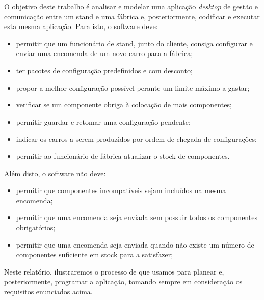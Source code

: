 O objetivo deste trabalho é analisar e modelar uma aplicação \textit{desktop} de gestão e comunicação entre um stand e uma fábrica e, posteriormente, codificar e executar esta mesma aplicação. Para isto, o software deve:
\begin{itemize}
    \item permitir que um funcionário de stand, junto do cliente, consiga configurar e enviar uma encomenda de um novo carro para a fábrica;
    \item ter pacotes de configuração predefinidos e com desconto;
    \item propor a melhor configuração possível perante um limite máximo a gastar;
    \item verificar se um componente obriga à colocação de mais componentes; 
    \item permitir guardar e retomar uma configuração pendente;
    \item indicar os carros a serem produzidos por ordem de chegada de configurações;
    \item permitir ao funcionário de fábrica atualizar o stock de componentes.
\end{itemize}

\noindent
Além disto, o software \underline{não} deve:

\begin{itemize}
    \item permitir que componentes incompatíveis sejam incluídos na mesma encomenda;
    \item permitir que uma encomenda seja enviada sem possuir todos os componentes obrigatórios;
    \item permitir que uma encomenda seja enviada quando não existe um número de componentes suficiente em stock para a satisfazer;
\end{itemize}

\noindent
Neste relatório, ilustraremos o processo de que usamos para planear e, posteriormente, programar a aplicação, tomando sempre em consideração os requisitos enunciados acima.